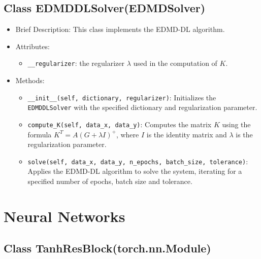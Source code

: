 \subsection{Class EDMDDLSolver(EDMDSolver)}

\begin{itemize}
\item Brief Description: This class implements the EDMD-DL algorithm.
\item Attributes:
  \begin{itemize}
  \item \lstinline|__regularizer|: the regularizer $\lambda$
    used in the computation of $K$.
  \end{itemize}
\item Methods:
  \begin{itemize}
  \item \lstinline|__init__(self, dictionary, regularizer)|:
    Initializes the \lstinline|EDMDDLSolver| with the specified dictionary
    and regularization parameter.
  \item \lstinline|compute_K(self, data_x, data_y)|:
    Computes the matrix $K$ using the formula $K^T = A(G + \lambda I)^+$,
    where $I$ is the identity matrix and $\lambda$ is the regularization parameter.
  \item \lstinline|solve(self, data_x, data_y, n_epochs, batch_size, tolerance)|:
    Applies the EDMD-DL algorithm to solve the system,
    iterating for a specified number of epochs, batch size and tolerance.
  \end{itemize}
\end{itemize}

\section{Neural Networks}

\subsection{Class TanhResBlock(torch.nn.Module)}


